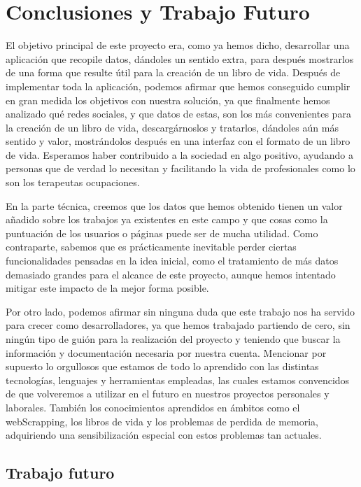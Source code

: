 \chapter{Conclusiones y Trabajo Futuro}
\label{cap:conclusiones}

El objetivo principal de este proyecto era, como ya hemos dicho, desarrollar una aplicación que recopile datos, dándoles un sentido extra, para después mostrarlos de una forma que resulte útil para la creación de un libro de vida. Después de implementar toda la aplicación, podemos afirmar que hemos conseguido cumplir en gran medida los objetivos con nuestra solución, ya que finalmente hemos analizado qué redes sociales, y que datos de estas, son los más convenientes para la creación de un libro de vida, descargárnoslos y tratarlos, dándoles aún más sentido y valor, mostrándolos después en una interfaz con el formato de un libro de vida. Esperamos haber contribuido a la sociedad en algo positivo, ayudando a personas que de verdad lo necesitan y facilitando la vida de profesionales como lo son los terapeutas ocupaciones. 

En la parte técnica, creemos que los datos que hemos obtenido tienen un valor añadido sobre los trabajos ya existentes en este campo y que cosas como la puntuación de los usuarios o páginas puede ser de mucha utilidad. Como contraparte, sabemos que es prácticamente inevitable perder ciertas funcionalidades pensadas en la idea inicial, como el tratamiento de más datos demasiado grandes para el alcance de este proyecto, aunque hemos intentado mitigar este impacto de la mejor forma posible.

Por otro lado, podemos afirmar sin ninguna duda que este trabajo nos ha servido para crecer como desarrolladores, ya que hemos trabajado partiendo de cero, sin ningún tipo de guión para la realización del proyecto y teniendo que buscar la información y documentación necesaria por nuestra cuenta. Mencionar por supuesto lo orgullosos que estamos de todo lo aprendido con las distintas tecnologías, lenguajes y herramientas empleadas, las cuales estamos convencidos de que volveremos a utilizar en el futuro en nuestros proyectos personales y laborales. También los conocimientos aprendidos en ámbitos como el webScrapping, los libros de vida y los problemas de perdida de memoria, adquiriendo una sensibilización especial con estos problemas tan actuales.

\section{Trabajo futuro}

